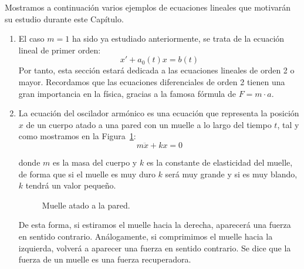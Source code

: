 \begin{ejemplo}
    Mostramos a continuación varios ejemplos de ecuaciones lineales que motivarán su estudio durante este Capítulo.
    \begin{enumerate}
        \item El caso $m=1$ ha sido ya estudiado anteriormente, se trata de la ecuación lineal de primer orden:
            \begin{equation*}
                x' + a_0(t)x = b(t)
            \end{equation*}
            Por tanto, esta sección estará dedicada a las ecuaciones lineales de orden 2 o mayor. Recordamos que las ecuaciones diferenciales de orden 2 tienen una gran importancia en la física, gracias a la famosa fórmula de $F=m\cdot a$.
        \item La ecuación del oscilador armónico es una ecuación que representa la posición $x$ de un cuerpo atado a una pared con un muelle a lo largo del tiempo $t$, tal y como mostramos en la Figura~\ref{fig:muelle}:
            \begin{equation*}
                m\ddot{x} + kx = 0
            \end{equation*}

            donde $m$ es la masa del cuerpo y $k$ es la constante de elasticidad del muelle, de forma que si el muelle es muy duro $k$ será muy grande y si es muy blando, $k$ tendrá un valor pequeño.

            \begin{figure}[H]
                \centering
            \caption{Muelle atado a la pared.}
            \label{fig:muelle}
            \end{figure}

            De esta forma, si estiramos el muelle hacia la derecha, aparecerá una fuerza en sentido contrario. Análogamente, si comprimimos el muelle hacia la izquierda, volverá a aparecer una fuerza en sentido contrario. Se dice que la fuerza de un muelle es una fuerza recuperadora.\\


\end{enumerate}
\end{ejemplo}
